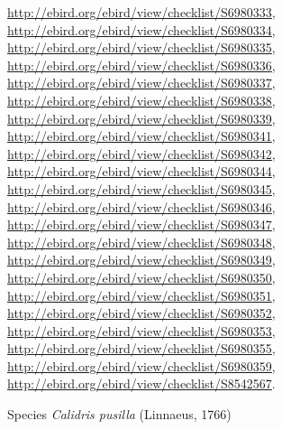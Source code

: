 \documentclass[9pt, article]{memoir}
\begin{document}
\begin{multicols}{2}
\url{http://ebird.org/ebird/view/checklist/S6980333}, 
\url{http://ebird.org/ebird/view/checklist/S6980334}, 
\url{http://ebird.org/ebird/view/checklist/S6980335}, 
\url{http://ebird.org/ebird/view/checklist/S6980336}, 
\url{http://ebird.org/ebird/view/checklist/S6980337}, 
\url{http://ebird.org/ebird/view/checklist/S6980338}, 
\url{http://ebird.org/ebird/view/checklist/S6980339}, 
\url{http://ebird.org/ebird/view/checklist/S6980341}, 
\url{http://ebird.org/ebird/view/checklist/S6980342}, 
\url{http://ebird.org/ebird/view/checklist/S6980344}, 
\url{http://ebird.org/ebird/view/checklist/S6980345}, 
\url{http://ebird.org/ebird/view/checklist/S6980346}, 
\url{http://ebird.org/ebird/view/checklist/S6980347}, 
\url{http://ebird.org/ebird/view/checklist/S6980348}, 
\url{http://ebird.org/ebird/view/checklist/S6980349}, 
\url{http://ebird.org/ebird/view/checklist/S6980350}, 
\url{http://ebird.org/ebird/view/checklist/S6980351}, 
\url{http://ebird.org/ebird/view/checklist/S6980352}, 
\url{http://ebird.org/ebird/view/checklist/S6980353}, 
\url{http://ebird.org/ebird/view/checklist/S6980355}, 
\url{http://ebird.org/ebird/view/checklist/S6980359}, 
\url{http://ebird.org/ebird/view/checklist/S8542567}.

\vspace{6pt}\noindent\hspace{36pt}Species \textit{Calidris pusilla} (Linnaeus, 1766)



\end{multicols}
\end{document}
